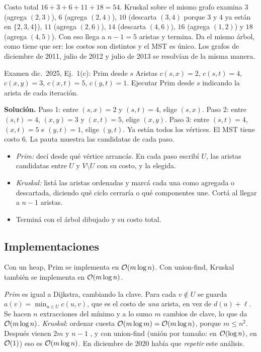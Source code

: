 Costo total $16+3+6+11+18=54$. Kruskal sobre el mismo grafo examina $3$ (agrega $(2,3)$), $6$ (agrega $(2,4)$), $10$ (descarta $(3,4)$ porque $3$ y $4$ ya están en $\{2,3,4\}$), $11$ (agrega $(2,6)$), $14$ (descarta $(4,6)$), $16$ (agrega $(1,2)$) y $18$ (agrega $(4,5)$). Con eso llega a $n-1=5$ aristas y termina. Da el mismo árbol, como tiene que ser: los costos son distintos y el MST es único. Los grafos de diciembre de 2011, julio de 2012 y julio de 2013 se resolvían de la misma manera.

\begin{problema}{Examen dic.~2025, Ej.~1(c): Prim desde $s$}
Aristas $c(s,x)=2$, $c(s,t)=4$, $c(x,y)=3$, $c(x,t)=5$, $c(y,t)=1$. Ejecutar Prim desde $s$ indicando la arista de cada iteración.

\smallskip
\textbf{Solución.} Paso 1: entre $(s,x)=2$ y $(s,t)=4$, elige $(s,x)$. Paso 2: entre $(s,t)=4$, $(x,y)=3$ y $(x,t)=5$, elige $(x,y)$. Paso 3: entre $(s,t)=4$, $(x,t)=5$ e $(y,t)=1$, elige $(y,t)$. Ya están todos los vértices. El MST tiene costo $6$. La pauta muestra las candidatas de cada paso.
\end{problema}

\begin{receta}
\begin{itemize}
  \item \emph{Prim:} decí desde qué vértice arrancás. En cada paso escribí $U$, las aristas candidatas entre $U$ y $V\setminus U$ con su costo, y la elegida.
  \item \emph{Kruskal:} listá las aristas ordenadas y marcá cada una como agregada o descartada, diciendo qué ciclo cerraría o qué componentes une. Cortá al llegar a $n-1$ aristas.
  \item Terminá con el árbol dibujado y su costo total.
\end{itemize}
\end{receta}

\subsection{Implementaciones}

\begin{resultado}[(4.22) y (4.25)]
Con un heap, Prim se implementa en $\mathcal{O}(m\log n)$. Con union-find, Kruskal también se implementa en $\mathcal{O}(m\log n)$.
\end{resultado}

\emph{Prim} es igual a Dijkstra, cambiando la clave. Para cada $v\notin U$ se guarda $a(v)=\min_{u\in U}c(u,v)$, que es el costo de \emph{una} arista, en vez de $d(u)+\ell$. Se hacen $n$ extracciones del mínimo y a lo sumo $m$ cambios de clave, lo que da $\mathcal{O}(m\log n)$. \emph{Kruskal}: ordenar cuesta $\mathcal{O}(m\log m)=\mathcal{O}(m\log n)$, porque $m\le n^2$. Después vienen $2m$  y $n-1$ , y con union-find (unión por tamaño:  en $\mathcal{O}(\log n)$,  en $\mathcal{O}(1)$) eso es $\mathcal{O}(m\log n)$. En diciembre de 2020 había que \emph{repetir} este análisis.

